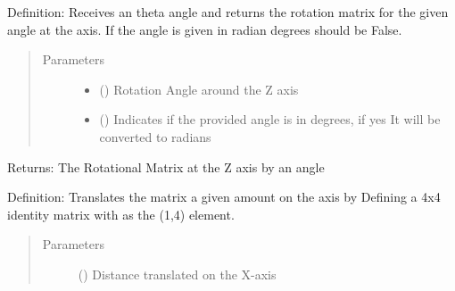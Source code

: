 \documentclass[letterpaper,10pt,english]{sphinxmanual}
\begin{document}
\begin{fulllineitems}
\begin{fulllineitems}
\label{\detokenize{rst/MatrixManipulation:MatrixManipulation.Matrix.rot_z}}
Definition: Receives an theta angle and returns the rotation matrix for the given angle at the  axis.
If the angle is given in radian degrees should be False.
\begin{quote}\begin{description}
\item[{Parameters}] \leavevmode\begin{itemize}
\item {} 
 () \textendash{} Rotation Angle around the Z axis

\item {} 
 () \textendash{} Indicates if the provided angle is in degrees, if yes It will be converted to radians

\end{itemize}

\end{description}\end{quote}

Returns: The Rotational Matrix at the Z axis by an  angle

\end{fulllineitems}


\begin{fulllineitems}
\label{\detokenize{rst/MatrixManipulation:MatrixManipulation.Matrix.trans_x}}
Definition: Translates the matrix a given amount  on the  axis by Defining a 4x4 identity
matrix with  as the (1,4) element.
\begin{quote}\begin{description}
\item[{Parameters}] \leavevmode
{} () \textendash{} Distance translated on the X-axis


\end{description}
\end{quote}
\end{fulllineitems}
\end{fulllineitems}
\end{document}

